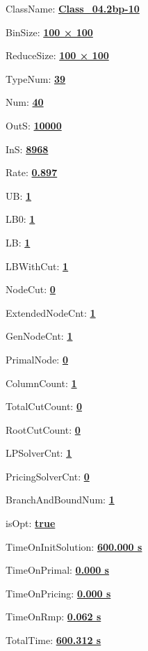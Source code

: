 \documentclass[11pt]{article}
\begin{document}
\pagestyle{empty}


ClassName: \underline{\textbf{Class_04.2bp-10}}
\par
BinSize: \underline{\textbf{100 × 100}}
\par
ReduceSize: \underline{\textbf{100 × 100}}
\par
TypeNum: \underline{\textbf{39}}
\par
Num: \underline{\textbf{40}}
\par
OutS: \underline{\textbf{10000}}
\par
InS: \underline{\textbf{8968}}
\par
Rate: \underline{\textbf{0.897}}
\par
UB: \underline{\textbf{1}}
\par
LB0: \underline{\textbf{1}}
\par
LB: \underline{\textbf{1}}
\par
LBWithCut: \underline{\textbf{1}}
\par
NodeCut: \underline{\textbf{0}}
\par
ExtendedNodeCnt: \underline{\textbf{1}}
\par
GenNodeCnt: \underline{\textbf{1}}
\par
PrimalNode: \underline{\textbf{0}}
\par
ColumnCount: \underline{\textbf{1}}
\par
TotalCutCount: \underline{\textbf{0}}
\par
RootCutCount: \underline{\textbf{0}}
\par
LPSolverCnt: \underline{\textbf{1}}
\par
PricingSolverCnt: \underline{\textbf{0}}
\par
BranchAndBoundNum: \underline{\textbf{1}}
\par
isOpt: \underline{\textbf{true}}
\par
TimeOnInitSolution: \underline{\textbf{600.000 s}}
\par
TimeOnPrimal: \underline{\textbf{0.000 s}}
\par
TimeOnPricing: \underline{\textbf{0.000 s}}
\par
TimeOnRmp: \underline{\textbf{0.062 s}}
\par
TotalTime: \underline{\textbf{600.312 s}}
\par
\newpage
\end{document}
